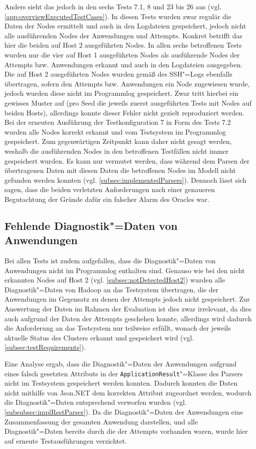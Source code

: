 Anders sieht das jedoch in den sechs Tests 7.1, 8 und 23 bis 26 aus (vgl. \cref{app:overviewExecutedTestCases}).
In diesen Tests wurden zwar regulär die Daten der Nodes ermittelt und auch in den Logdateien gespeichert, jedoch nicht alle ausführenden Nodes der Anwendungen und Attempts.
Konkret betrifft das hier die beiden auf Host 2 ausgeführten Nodes.
In allen sechs betroffenen Tests wurden nur die vier auf Host 1 ausgeführten Nodes als ausführende Nodes der Attempts bzw. Anwendungen erkannt und auch in den Logdateien ausgegeben.
Die auf Host 2 ausgeführten Nodes wurden gemäß des SSH"=Logs ebenfalls übertragen, sofern den Attempts bzw. Anwendungen ein Node zugewiesen wurde, jedoch wurden diese nicht im Programmlog gespeichert.
Zwar tritt hierbei ein gewisses Muster auf (pro Seed die jeweils zuerst ausgeführten Tests mit Nodes auf beiden Hosts), allerdings konnte dieser Fehler nicht gezielt reproduziert werden.
Bei der erneuten Ausführung der Testkonfiguration 7 in Form des Tests 7.2 wurden alle Nodes korrekt erkannt und vom Testsystem im Programmlog gespeichert.
Zum gegenwärtigen Zeitpunkt kann daher nicht gesagt werden, weshalb die ausführenden Nodes in den betroffenen Testfällen nicht immer gespeichert wurden.
Es kann nur vermutet werden, dass während dem Parsen der übertragenen Daten mit diesen Daten die betroffenen Nodes im Modell nicht gefunden werden konnten (vgl. \cref{subsec:implementedParsers}).
Dennoch lässt sich sagen, dass die beiden verletzten Anforderungen nach einer genaueren Begutachtung der Gründe dafür ein falscher Alarm des Oracles war.

\subsection{Fehlende Diagnostik"=Daten von Anwendungen}
\label{subsec:notSavedAppDiagnostics}

Bei allen Tests ist zudem aufgefallen, dass die Diagnostik"=Daten von Anwendungen nicht im Programmlog enthalten sind.
Genauso wie bei den nicht erkannten Nodes auf Host 2 (vgl. \cref{subsec:notDetectedHost2}) wurden alle Diagnostik"=Daten von Hadoop an das Testsystem übertragen, die der Anwendungen im Gegensatz zu denen der Attempts jedoch nicht gespeichert.
Zur Auswertung der Daten im Rahmen der Evaluation ist dies zwar irrelevant, da dies auch aufgrund der Daten der Attempts geschehen konnte, allerdings wird dadurch die Anforderung an das Testsystem nur teilweise erfüllt, wonach der jeweils aktuelle Status des Clusters erkannt und gespeichert wird (vgl. \cref{subsec:testRequirements}).

Eine Analyse ergab, dass die Diagnostik"=Daten der Anwendungen aufgrund eines falsch gesetzten Attributs in der \texttt{ApplicationResult}"=Klasse des Parsers nicht im Testsystem gespeichert werden konnten.
Dadurch konnten die Daten nicht mithilfe von Json.NET dem korrekten Attribut zugeordnet werden, wodurch die Diagnostik"=Daten entsprechend verworfen wurden (vgl. \cref{subsubsec:implRestParser}).
Da die Diagnostik"=Daten der Anwendungen eine Zusammenfassung der gesamten Anwendung darstellen, und alle Diagnostik"=Daten bereits durch die der Attempts vorhanden waren, wurde hier auf erneute Testausführungen verzichtet.
